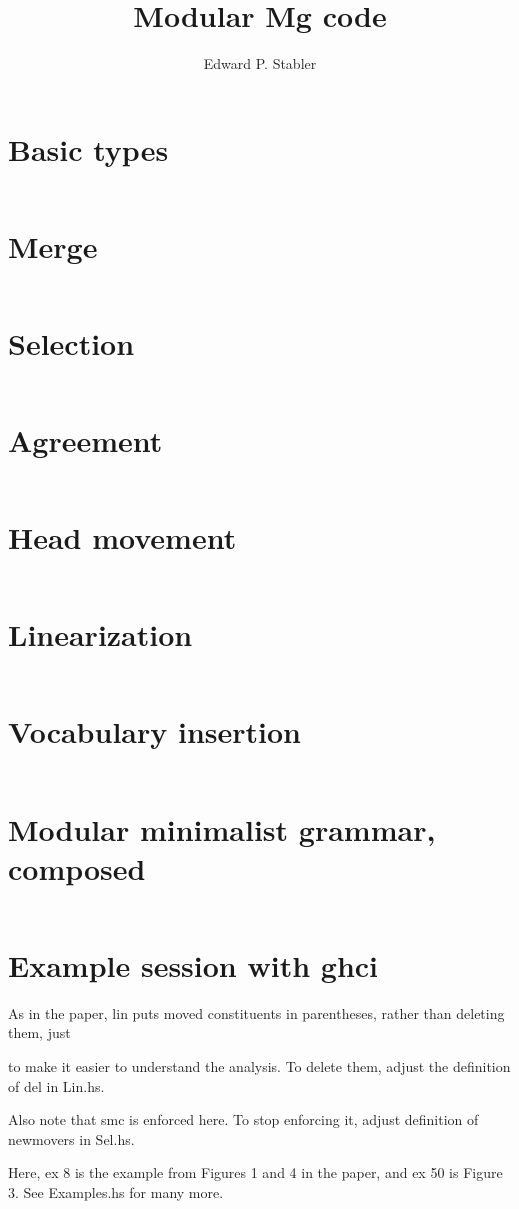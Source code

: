 \documentclass{article}
\title{Modular Mg code}
\author{Edward P. Stabler}
\begin{document}
\thispagestyle{empty}

\setcounter{section}{-1}

\eject
\section{Basic types}
\inputminted[fontsize=\footnotesize]{haskell}{MgTypes.hs}

\section{Merge}
\inputminted[fontsize=\footnotesize]{haskell}{Mrg.hs}

\section{Selection}
\inputminted[fontsize=\footnotesize]{haskell}{Sel.hs}

\eject
\section{Agreement}
\inputminted[fontsize=\footnotesize]{haskell}{Agr.hs}

\vfill\eject
\section{Head movement}
\inputminted[fontsize=\footnotesize]{haskell}{Hm.hs}

\section{Linearization}
\inputminted[fontsize=\footnotesize]{haskell}{Lin.hs}

\eject
\section{Vocabulary insertion}
\inputminted[fontsize=\footnotesize]{haskell}{Vi.hs}

\section{Modular minimalist grammar, composed}
\inputminted[fontsize=\footnotesize]{haskell}{Mg.hs}

\eject
\section*{Example session with ghci}
As in the paper, lin puts moved constituents in parentheses, rather
than deleting them, just

to make it easier to understand the analysis. To delete them, adjust
the definition of del in Lin.hs.

\noindent
Also note that smc is enforced here. To stop enforcing it, adjust
definition of newmovers in Sel.hs.

\noindent
Here, ex 8 is the example from Figures 1 and 4 in the paper, and ex 50
is Figure 3. See Examples.hs for many more.

\inputminted[fontsize=\footnotesize]{haskell}{Examples-session.txt}
\end{document}
